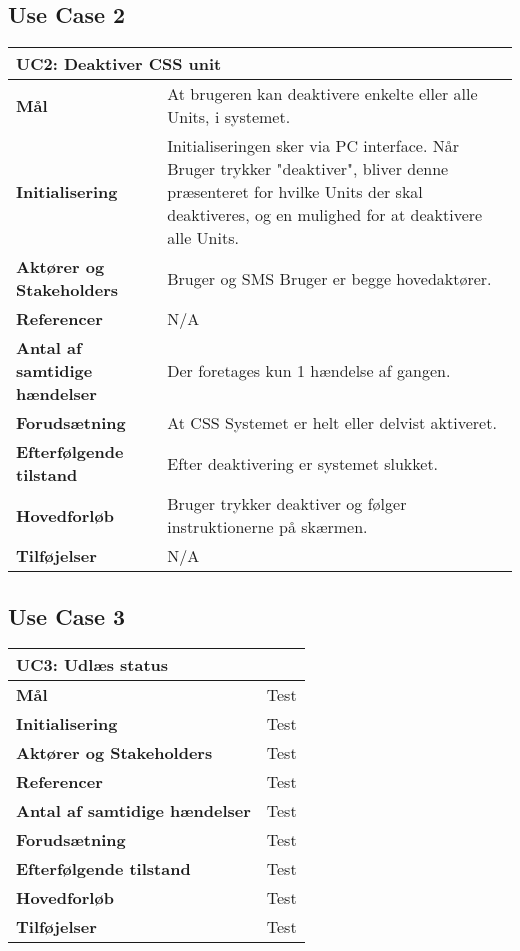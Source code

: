\subsection{Use Case 2}
\begin{table}[H] \centering
\begin{tabular}{|p{6cm}|p{8cm}|}
	\hline
\multicolumn{2}{|l|}{\textbf{UC2: Deaktiver CSS unit}} \\\hline
\textbf{Mål}	&
At brugeren kan deaktivere enkelte eller alle Units, i systemet.
\\\hline
\textbf{Initialisering} &
Initialiseringen sker via PC interface. Når Bruger trykker "deaktiver", bliver denne
præsenteret for hvilke Units der skal deaktiveres, og en mulighed for at deaktivere alle
Units. 
\\\hline
\textbf{Aktører og Stakeholders}	&
Bruger og SMS Bruger er begge hovedaktører.
\\\hline
\textbf{Referencer} &
N/A
\\\hline
\textbf{Antal af samtidige hændelser} &
Der foretages kun 1 hændelse af gangen.
\\\hline
\textbf{Forudsætning} &
At CSS Systemet er helt eller delvist aktiveret.
\\\hline
\textbf{Efterfølgende tilstand} &
Efter deaktivering er systemet slukket.
\\\hline
\textbf{Hovedforløb}	&
Bruger trykker deaktiver og følger instruktionerne på skærmen.
\\\hline
\textbf{Tilføjelser}	&
N/A
\\\hline
	\end{tabular}
	\label{tab:UC2} 
\end{table}


\subsection{Use Case 3}
\begin{table}[H] \centering
\begin{tabular}{|p{6cm}|p{8cm}|}
	\hline
\multicolumn{2}{|l|}{\textbf{UC3: Udlæs status}} \\\hline
\textbf{Mål}								&Test \\\hline
\textbf{Initialisering}					&Test \\\hline
\textbf{Aktører og Stakeholders}			&Test \\\hline
\textbf{Referencer}						&Test \\\hline
\textbf{Antal af samtidige hændelser}	&Test \\\hline
\textbf{Forudsætning}					&Test \\\hline
\textbf{Efterfølgende tilstand}			&Test \\\hline
\textbf{Hovedforløb}						&Test \\\hline
\textbf{Tilføjelser}						&Test \\\hline
	\end{tabular}
	\label{UC3} 
\end{table}

